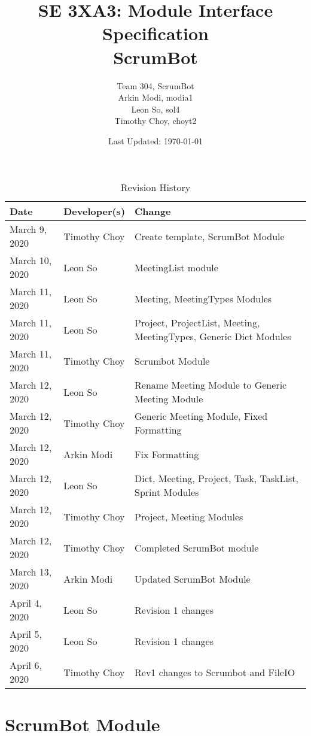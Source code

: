 \documentclass[12pt, titlepage]{article}
\title{SE 3XA3: Module Interface Specification\\ScrumBot}
\author{
	Team 304, ScrumBot
		\\ Arkin Modi, modia1
        \\ Leon So, sol4
        \\ Timothy Choy, choyt2
}
\date{Last Updated: \today}
\begin{document}
\maketitle

\begin{table}[H]
    \caption{Revision History} \label{TblRevisionHistory}
    \begin{tabularx}{\textwidth}{llX}
        \toprule
            \textbf{Date} & \textbf{Developer(s)} & \textbf{Change}\\
        \midrule
            March 9, 2020 & Timothy Choy & Create template, ScrumBot Module\\
            March 10, 2020 & Leon So & MeetingList module\\
            March 11, 2020 & Leon So & Meeting, MeetingTypes Modules\\
            March 11, 2020 & Leon So & Project, ProjectList, Meeting, MeetingTypes, Generic Dict Modules\\
            March 11, 2020 & Timothy Choy & Scrumbot Module\\
            March 12, 2020 & Leon So & Rename Meeting Module to Generic Meeting Module\\
            March 12, 2020 & Timothy Choy & Generic Meeting Module, Fixed Formatting\\
            March 12, 2020 & Arkin Modi & Fix Formatting\\
            March 12, 2020 & Leon So & Dict, Meeting, Project, Task, TaskList, Sprint Modules\\
            March 12, 2020 & Timothy Choy & Project, Meeting Modules\\
            March 12, 2020 & Timothy Choy & Completed ScrumBot module\\
            March 13, 2020 & Arkin Modi & Updated ScrumBot Module\\
            April 4, 2020 & Leon So & Revision 1 changes\\
            April 5, 2020 & Leon So & Revision 1 changes\\
            April 6, 2020 & Timothy Choy & Rev1 changes to Scrumbot and FileIO\\
        \bottomrule
    \end{tabularx}
\end{table}

\newpage
\section* {ScrumBot Module}
\end{document}
